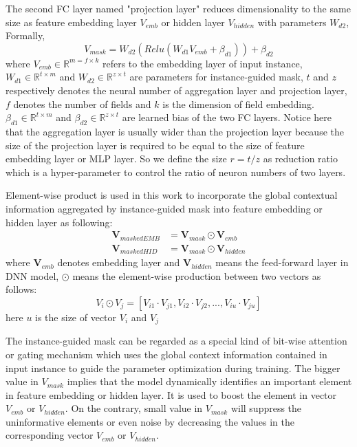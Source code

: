 \documentclass[sigconf]{acmart}
\begin{document}
The second FC layer named "projection layer" reduces dimensionality to the same size as feature embedding layer $V_{emb}$ or hidden layer $V_{hidden}$ with parameters $W_{d2}$, Formally,
\begin{equation}
  V_{mask} = W_{d2}(Relu(W_{d1}V_{emb} + \beta_{d1})) + \beta_{d2}
\end{equation}
where $V_{emb} \in \mathbb{R}^{m=f\times k}$ refers to the embedding layer of input instance, $W_{d1} \in \mathbb{R}^{t\times m}$ and $W_{d2} \in \mathbb{R}^{z\times t}$ are parameters for instance-guided mask, $t$ and $z$ respectively denotes the neural number of aggregation layer and projection layer, $f$ denotes the number of fields and $k$ is the dimension of field embedding. $\beta_{d1} \in \mathbb{R}^{t\times m}$ and $\beta_{d2} \in \mathbb{R}^{z\times t}$ are learned bias of the two FC layers. Notice here that the aggregation layer is usually wider than the projection layer because the size of the projection layer is required to be equal to the size of feature embedding layer or MLP layer. So we define the size $r=t/z$ as reduction ratio which is a hyper-parameter to control the ratio of neuron numbers of two layers.


Element-wise product is used in this work to incorporate the global contextual information aggregated by instance-guided mask into feature embedding or hidden layer as following:
\begin{equation}
  \begin{split}
  \mathbf{V}_{maskedEMB} &= \mathbf{V}_{mask} \odot \mathbf{V}_{emb} \\
  \mathbf{V}_{maskedHID} &= \mathbf{V}_{mask} \odot \mathbf{V}_{hidden}
\end{split}
\end{equation}
where $\mathbf{V}_{emb}$ denotes embedding layer and $\mathbf{V}_{hidden}$ means the feed-forward layer in DNN model, $\odot$ means the element-wise production between two vectors as follows:
\begin{equation}
  V_i \odot V_j = [V_{i1} \cdot V_{j1}, V_{i2} \cdot V_{j2}, ..., V_{iu} \cdot V_{ju}]
\end{equation}
here $u$ is the size of vector $V_i$ and $V_j$



The instance-guided mask can be regarded as a special kind of bit-wise attention or gating mechanism which uses the global context information contained in input instance to guide the parameter optimization during training. The bigger value in $V_{mask}$ implies that the model dynamically identifies an important element in feature embedding or hidden layer. It is used to boost the element in vector $V_{emb}$ or $V_{hidden}$. On the contrary, small value in $V_{mask}$ will suppress the uninformative elements or even noise by decreasing the values in the corresponding vector $V_{emb}$ or $V_{hidden}$.
\end{document}
